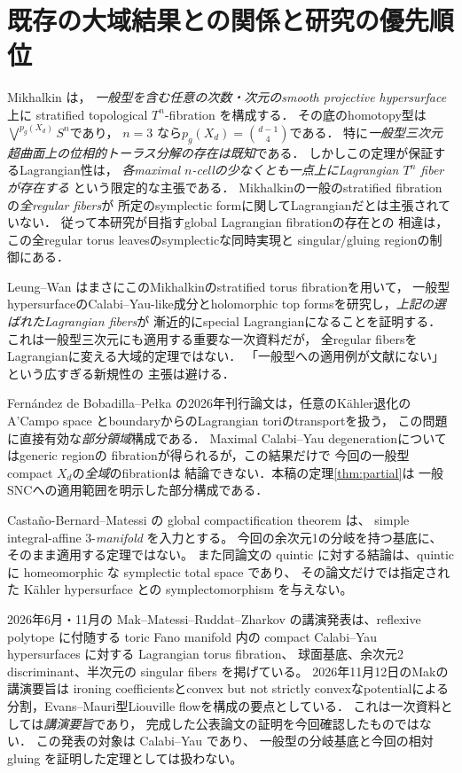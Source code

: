 \documentclass[11pt,a4paper]{article}
\theoremstyle{definition}
\begin{document}
\section{既存の大域結果との関係と研究の優先順位}\label{sec:literature}

Mikhalkin \cite[Theorem~1, Corollary~3.1]{mikhalkin} は，
\emph{一般型を含む任意の次数・次元のsmooth projective hypersurface}
上に stratified topological $T^n$-fibration を構成する．
その底のhomotopy型は$\bigvee^{p_g(X_d)}S^n$であり，
$n=3$ なら$p_g(X_d)=\binom{d-1}{4}$である．
特に\emph{一般型三次元超曲面上の位相的トーラス分解の存在は既知}である．
しかしこの定理が保証するLagrangian性は，
\emph{各maximal $n$-cellの少なくとも一点上にLagrangian $T^n$ fiberが存在する}
という限定的な主張である．
Mikhalkinの一般のstratified fibrationの\emph{全regular fibers}が
所定のsymplectic formに関してLagrangianだとは主張されていない．
従って本研究が目指すglobal Lagrangian fibrationの存在との
相違は，この全regular torus leavesのsymplecticな同時実現と
singular/gluing regionの制御にある．

Leung--Wan \cite[Theorem~2.4, Theorem~3.3]{leung-wan}
はまさにこのMikhalkinのstratified torus fibrationを用いて，
一般型hypersurfaceのCalabi--Yau-like成分とholomorphic
top formsを研究し，\emph{上記の選ばれたLagrangian fibers}が
漸近的にspecial Lagrangianになることを証明する．
これは一般型三次元にも適用する重要な一次資料だが，
全regular fibersをLagrangianに変える大域的定理ではない．
「一般型への適用例が文献にない」という広すぎる新規性の
主張は避ける．

Fernández de Bobadilla--Pełka \cite[Theorem~6.14]{fbp}
の2026年刊行論文は，任意のK\"ahler退化のA'Campo space
とboundaryからのLagrangian toriのtransportを扱う，
この問題に直接有効な\emph{部分領域}構成である．
Maximal Calabi--Yau degenerationについてはgeneric regionの
fibrationが得られるが，この結果だけで
今回の一般型compact $X_d$の\emph{全域}のfibrationは
結論できない．本稿の定理\ref{thm:partial}は
一般SNCへの適用範囲を明示した部分構成である．

Castaño-Bernard--Matessi \cite[Theorem 8.2]{cbm} の global compactification theorem は、
simple integral-affine 3-\emph{manifold} を入力とする。
今回の余次元1の分岐を持つ基底に、そのまま適用する定理ではない。
また同論文の quintic に対する結論は、quintic に homeomorphic な symplectic total space であり、
その論文だけでは指定された Kähler hypersurface との symplectomorphism を与えない。

2026年6月・11月の Mak--Matessi--Ruddat--Zharkov の講演発表は、reflexive polytope に付随する
toric Fano manifold 内の compact Calabi--Yau hypersurfaces に対する Lagrangian torus fibration、
球面基底、余次元2 discriminant、半次元の singular fibers を掲げている\cite{ruddat-talk,mak-2026-talk}。
2026年11月12日のMakの講演要旨は
ironing coefficientsとconvex but not strictly convexなpotentialによる
分割，Evans--Mauri型Liouville flowを構成の要点としている．
これは一次資料としては\emph{講演要旨}であり，
完成した公表論文の証明を今回確認したものではない．
この発表の対象は Calabi--Yau であり、
一般型の分岐基底と今回の相対 gluing を証明した定理としては扱わない。
\end{document}
